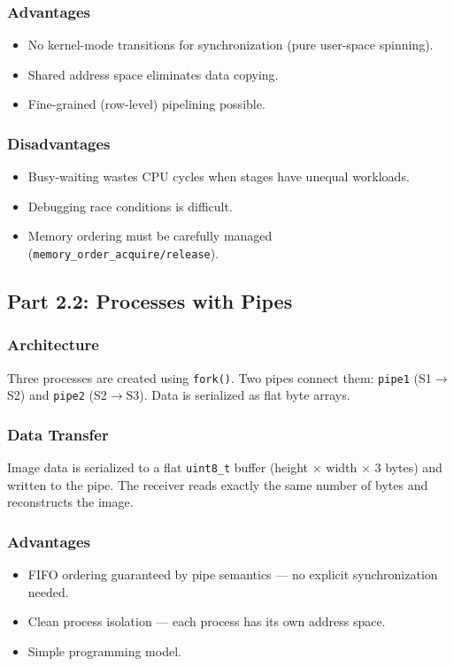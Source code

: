 \documentclass[12pt,a4paper]{article}
\begin{document}
\subsubsection{Advantages}
\begin{itemize}
    \item No kernel-mode transitions for synchronization (pure user-space spinning).
    \item Shared address space eliminates data copying.
    \item Fine-grained (row-level) pipelining possible.
\end{itemize}

\subsubsection{Disadvantages}
\begin{itemize}
    \item Busy-waiting wastes CPU cycles when stages have unequal workloads.
    \item Debugging race conditions is difficult.
    \item Memory ordering must be carefully managed (\texttt{memory\_order\_acquire/release}).
\end{itemize}

\subsection{Part 2.2: Processes with Pipes}

\subsubsection{Architecture}
Three processes are created using \texttt{fork()}. Two pipes connect them: \texttt{pipe1} (S1$\to$S2) and \texttt{pipe2} (S2$\to$S3). Data is serialized as flat byte arrays.

\subsubsection{Data Transfer}
Image data is serialized to a flat \texttt{uint8\_t} buffer (height $\times$ width $\times$ 3 bytes) and written to the pipe. The receiver reads exactly the same number of bytes and reconstructs the image.

\subsubsection{Advantages}
\begin{itemize}
    \item FIFO ordering guaranteed by pipe semantics --- no explicit synchronization needed.
    \item Clean process isolation --- each process has its own address space.
    \item Simple programming model.
\end{itemize}
\end{document}

